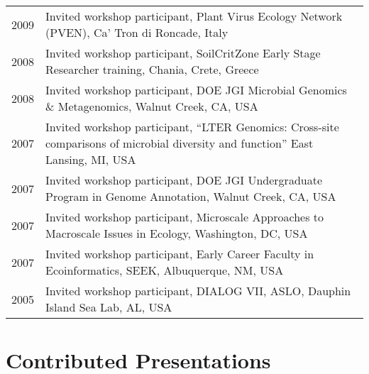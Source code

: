 \documentclass[11pt]{article}
\begin{document}
\begin{longtable}{@{}p{2cm}@{\hspace{1em}}p{14cm}@{}}
2009 & Invited workshop participant, Plant Virus Ecology Network (PVEN), Ca’ Tron di Roncade, Italy \\
2008 & Invited workshop participant, SoilCritZone Early Stage Researcher training, Chania, Crete, Greece \\
2008 & Invited workshop participant, DOE JGI Microbial Genomics \& Metagenomics, Walnut Creek, CA, USA \\
2007 & Invited workshop participant, “LTER Genomics: Cross-site comparisons of microbial diversity and function” East Lansing, MI, USA \\
2007 & Invited workshop participant, DOE JGI Undergraduate Program in Genome Annotation, Walnut Creek, CA, USA \\
2007 & Invited workshop participant, Microscale Approaches to Macroscale Issues in Ecology, Washington, DC, USA \\
2007 & Invited workshop participant, Early Career Faculty in Ecoinformatics, SEEK, Albuquerque, NM, USA \\
2005 & Invited workshop participant, DIALOG VII, ASLO, Dauphin Island Sea Lab, AL, USA \\
\end{longtable}

\section*{Contributed Presentations}
\vspace{-0.5em}
\end{document}

